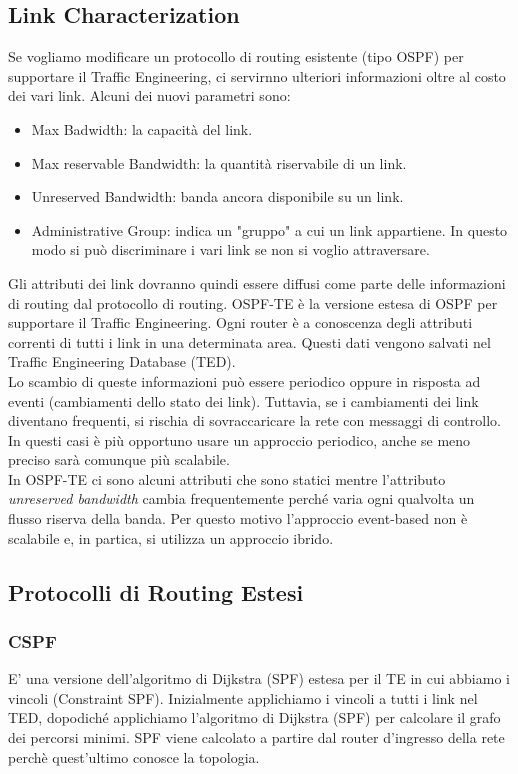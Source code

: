 \documentclass{article}
\begin{document}
\subsection{Link Characterization}
Se vogliamo modificare un protocollo di routing esistente (tipo OSPF) per supportare il Traffic Engineering, ci servirnno ulteriori informazioni oltre al costo dei vari link. Alcuni dei nuovi parametri sono:
\begin{itemize}
    \item Max Badwidth: la capacità del link.
    \item Max reservable Bandwidth: la quantità riservabile di un link.
    \item Unreserved Bandwidth: banda ancora disponibile su un link.
    \item Administrative Group: indica un "gruppo" a cui un link appartiene. In questo modo si può discriminare i vari link se non si voglio attraversare.
\end{itemize}
Gli attributi dei link dovranno quindi essere diffusi come parte delle informazioni di routing dal protocollo di routing. OSPF-TE è la versione estesa di OSPF per supportare il Traffic Engineering. Ogni router è a conoscenza degli attributi correnti di tutti i link in una determinata area. Questi dati vengono salvati nel Traffic Engineering Database (TED).\\
Lo scambio di queste informazioni può essere periodico oppure in risposta ad eventi (cambiamenti dello stato dei link). Tuttavia, se i cambiamenti dei link diventano frequenti, si rischia di sovraccaricare la rete con messaggi di controllo. In questi casi è più opportuno usare un approccio periodico, anche se meno preciso sarà comunque più scalabile.\\
In OSPF-TE ci sono alcuni attributi che sono statici mentre l'attributo \textit{unreserved bandwidth} cambia frequentemente perché varia ogni qualvolta un flusso riserva della banda. Per questo motivo l'approccio event-based non è scalabile e, in partica, si utilizza un approccio ibrido.

\subsection{Protocolli di Routing Estesi}
\subsubsection{CSPF}
E' una versione dell'algoritmo di Dijkstra (SPF) estesa per il TE in cui abbiamo i vincoli (Constraint SPF). Inizialmente applichiamo i vincoli a tutti i link nel TED, dopodiché applichiamo l'algoritmo di Dijkstra (SPF) per calcolare il grafo dei percorsi minimi. SPF viene calcolato a partire dal router d'ingresso della rete perchè quest'ultimo conosce la topologia.
\end{document}
